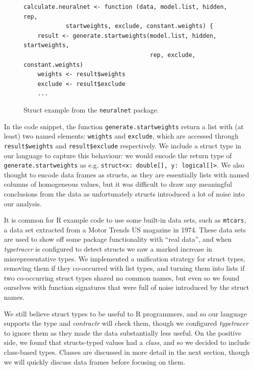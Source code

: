 \documentclass[acmsmall,review,anonymous]{acmart}\settopmatter{printfolios=true,printccs=false,printacmref=false}
\newcommand{\code}[1]{{\lstinline[style=Rin]!#1!}\xspace}
\newcommand{\contractr}{\emph{contractr}\xspace} %
\newcommand{\typetracer}{\emph{typetracer}\xspace} %
\begin{document}
\begin{figure}[htbp]
\begin{center}

\begin{lstlisting}
calculate.neuralnet <- function (data, model.list, hidden, rep,
            startweights, exclude, constant.weights) {
    result <- generate.startweights(model.list, hidden, startweights,
                                    rep, exclude, constant.weights)
    weights <- result$weights
    exclude <- result$exclude
    ...
\end{lstlisting}

\caption{Struct example from the \code{neuralnet} package.}
\label{fig:struct-ex}
\end{center}
\end{figure}

In the code snippet, the function \code{generate.startweights} return a list with (at least) two named elements: \code{weights} and \code{exclude}, which are accessed through \code{result$weights} and \code{result$exclude} respectively.
We include a struct type in our language to capture this behaviour: we would encode the return type of \code{generate.startweights} as e.g. \code{struct<x: double[], y: logical[]>}.  
We also thought to encode data frames as structs, as they are essentially lists with named columns of homogeneous values, but it was difficult to draw any meaningful conclusions from the data as unfortunately structs introduced a lot of noise into our analysis.

It is common for R example code to use some built-in data sets, such as \code{mtcars}, a data set extracted from a Motor Trends US magazine in 1974.
These data sets are used to show off some package functionality with ``real data'', and when \typetracer is configured to detect structs we saw a marked increase in misrepresentative types.
We implemented a unification strategy for struct types, removing them if they co-occurred with list types, and turning them into lists if two co-occurring struct types shared no common names, but even so we found ourselves with function signatures that were full of noise introduced by the struct names.

We still believe struct types to be useful to R programmers, and so our language supports the type and \contractr will check them, though we configured \typetracer to ignore them as they made the data substantially less useful.
On the positive side, we found that  structs-typed values had a {\it class}, and so we decided to include class-based types.
Classes are discussed in more detail in the next section, though we will quickly discuss data frames before focusing on them. 
\end{document}
